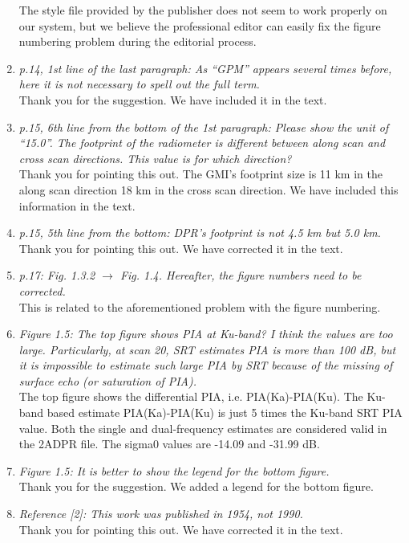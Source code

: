 \documentclass[12pt]{article}
\begin{document}
\begin{enumerate}
{    The style file provided by the publisher does not seem to work properly on our system, but we believe the professional editor can easily fix the
    figure numbering problem during the editorial process.
    }
    \item{\textit{p.14, 1st line of the last paragraph: As “GPM” appears several times before, here it is not
    necessary to spell out the full term.}\\
    Thank you for the suggestion. We have included it in the text.
    }
    \item{\textit{p.15, 6th line from the bottom of the 1st paragraph: Please show the unit of “15.0”. The
    footprint of the radiometer is different between along scan and cross scan directions. This
    value is for which direction?}\\
    Thank you for pointing this out. The GMI's footprint size is 11 km in the along scan direction 18 km in the cross scan direction.
    We have included this information in the text.
    }
    \item{\textit{p.15, 5th line from the bottom: DPR’s footprint is not 4.5 km but 5.0 km.}\\
    Thank you for pointing this out.  We have corrected it in the text.
    }
    \item{\textit{p.17: Fig. 1.3.2 $\rightarrow$ Fig. 1.4. Hereafter, the figure numbers need to be corrected.}\\
    This is related to the aforementioned problem with the figure numbering.
    }
    \item{\textit{Figure 1.5: The top figure shows PIA at Ku-band? I think the values are too large. Particularly,
    at scan 20, SRT estimates PIA is more than 100 dB, but it is impossible to estimate such large
    PIA by SRT because of the missing of surface echo (or saturation of PIA).}\\
    The top figure shows the differential PIA, i.e. PIA(Ka)-PIA(Ku). The Ku-band based estimate PIA(Ka)-PIA(Ku) is just 5 
    times the Ku-band SRT PIA value.
    Both the single and dual-frequency estimates are considered valid in the 2ADPR file.  The sigma0 values are -14.09 and
    -31.99 dB.
    }
    \item{\textit{Figure 1.5: It is better to show the legend for the bottom figure.}\\
    Thank you for the suggestion. We added a legend for the bottom figure.
    }
    \item{\textit{Reference [2]: This work was published in 1954, not 1990.}\\
    Thank you for pointing this out.  We have corrected it in the text.
    }

\end{enumerate}
\end{document}

